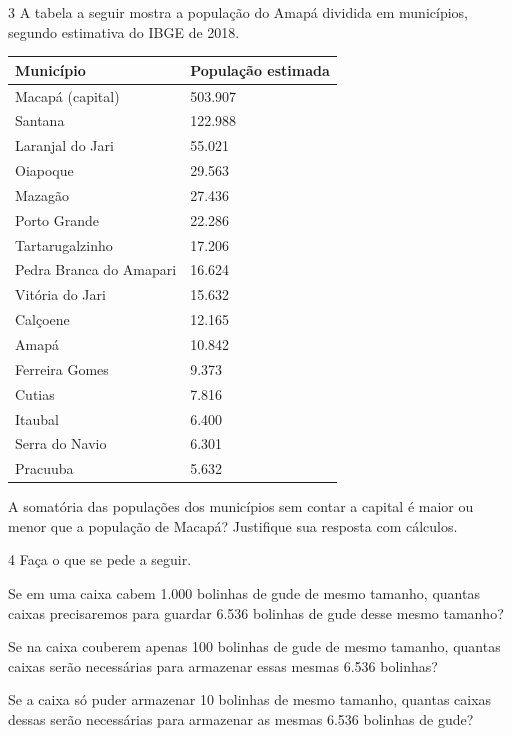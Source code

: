 \num{3} A tabela a seguir mostra a população do Amapá dividida em municípios, segundo estimativa do IBGE de 2018.

\begin{longtable}[]{@{}ll@{}}
\toprule
Município & População estimada\tabularnewline
\midrule
\endhead
Macapá (capital) & 503.907\tabularnewline
Santana & 122.988\tabularnewline
Laranjal do Jari & 55.021\tabularnewline
Oiapoque & 29.563\tabularnewline
Mazagão & 27.436\tabularnewline
Porto Grande & 22.286\tabularnewline
Tartarugalzinho & 17.206\tabularnewline
Pedra Branca do Amapari & 16.624\tabularnewline
Vitória do Jari & 15.632\tabularnewline
Calçoene & 12.165\tabularnewline
Amapá & 10.842\tabularnewline
Ferreira Gomes & 9.373\tabularnewline
Cutias & 7.816\tabularnewline
Itaubal & 6.400\tabularnewline
Serra do Navio & 6.301\tabularnewline
Pracuuba & 5.632\tabularnewline
\bottomrule
\end{longtable}

A somatória das populações dos municípios sem contar a capital é maior ou menor que a população de Macapá? Justifique sua resposta com cálculos.

\begin{mdframed}[linewidth=2pt,linecolor=salmao,roundcorner=2pt]

\end{mdframed}

\num{4} Faça o que se pede a seguir.

\begin{escolha}
\item
  Se em uma caixa cabem 1.000 bolinhas de gude de mesmo tamanho, quantas
  caixas precisaremos para guardar 6.536 bolinhas de gude desse mesmo
  tamanho?

\item
  Se na caixa couberem apenas 100 bolinhas de gude de mesmo tamanho, quantas
  caixas serão necessárias para armazenar essas mesmas 6.536 bolinhas?

\item
  Se a caixa só puder armazenar 10 bolinhas de mesmo tamanho, quantas caixas dessas
  serão necessárias para armazenar as mesmas 6.536 bolinhas de gude?
\end{escolha}

